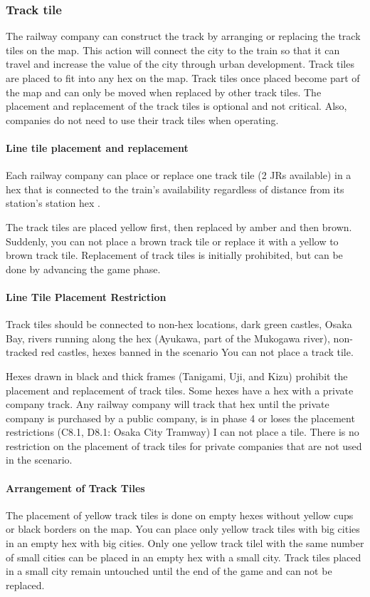 \documentclass{article}
\begin{document}
\begin{CJK}{UTF8}{min}
\subsubsection{Track tile}
The railway company can construct the track by arranging or replacing
the track tiles on the map. This action will connect the city to the
train so that it can travel and increase the value of the city through
urban development. Track tiles are placed to fit into any hex on the
map. Track tiles once placed become part of the map and can only be
moved when replaced by other track tiles. The placement and
replacement of the track tiles is optional and not critical. Also,
companies do not need to use their track tiles when operating.

\paragraph{Line tile placement and replacement}
Each railway company can place or replace one track tile (2 JRs
available) in a hex that is connected to the train's availability
regardless of distance from its station's station hex .

The track tiles are placed yellow first, then replaced by amber and
then brown. Suddenly, you can not place a brown track tile or replace
it with a yellow to brown track tile. Replacement of track tiles is
initially prohibited, but can be done by advancing the game phase.

\paragraph{Line Tile Placement Restriction}
Track tiles should be connected to non-hex locations, dark green
castles, Osaka Bay, rivers running along the hex (Ayukawa, part of the
Mukogawa river), non-tracked red castles, hexes banned in the scenario
You can not place a track tile.

Hexes drawn in black and thick frames (Tanigami, Uji, and Kizu)
prohibit the placement and replacement of track tiles. Some hexes have
a hex with a private company track. Any railway company will track
that hex until the private company is purchased by a public company,
is in phase 4 or loses the placement restrictions (C8.1, D8.1: Osaka
City Tramway) I can not place a tile. There is no restriction on the
placement of track tiles for private companies that are not used in
the scenario.

\paragraph{Arrangement of Track Tiles}
The placement of yellow track tiles is done on empty hexes without
yellow cups or black borders on the map. You can place only yellow
track tiles with big cities in an empty hex with big cities. Only one
yellow track tilel with the same number of small cities can be placed
in an empty hex with a small city. Track tiles placed in a small city
remain untouched until the end of the game and can not be replaced.


\end{CJK}
\end{document}
